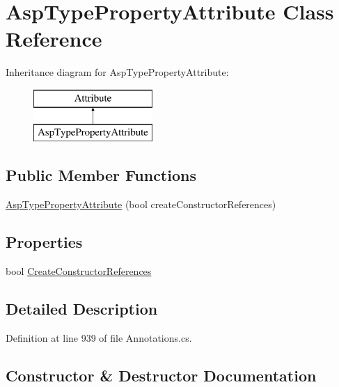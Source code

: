 \hypertarget{class_asp_type_property_attribute}{}\section{Asp\+Type\+Property\+Attribute Class Reference}
\label{class_asp_type_property_attribute}
Inheritance diagram for Asp\+Type\+Property\+Attribute\+:\begin{figure}[H]
\begin{center}
\leavevmode
\includegraphics[height=2.000000cm]{class_asp_type_property_attribute}
\end{center}
\end{figure}
\subsection*{Public Member Functions}
\begin{DoxyCompactItemize}
\item 
\hyperlink{class_asp_type_property_attribute_a44e918652832a5c2272af6b3c85d12d1}{Asp\+Type\+Property\+Attribute} (bool create\+Constructor\+References)
\end{DoxyCompactItemize}
\subsection*{Properties}
\begin{DoxyCompactItemize}
\item 
bool \hyperlink{class_asp_type_property_attribute_a57bbcf991d77058648e6292b63726241}{Create\+Constructor\+References}
\end{DoxyCompactItemize}


\subsection{Detailed Description}


Definition at line 939 of file Annotations.\+cs.



\subsection{Constructor \& Destructor Documentation}
\hypertarget{class_asp_type_property_attribute_a44e918652832a5c2272af6b3c85d12d1}{}
